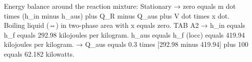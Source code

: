 Energy balance around the reaction mixture:  
Stationary → zero equals m dot times (h_in minus h_aus) plus Q_R minus Q_aus plus V dot times x dot.  
Boiling liquid (⇔) in two-phase area with x equals zero.  
TAB A2 → h_in equals h_f equals 292.98 kilojoules per kilogram.  
h_aus equals h_f (locc) equals 419.94 kilojoules per kilogram.  
→ Q_aus equals 0.3 times [292.98 minus 419.94] plus 100 equals 62.182 kilowatts.